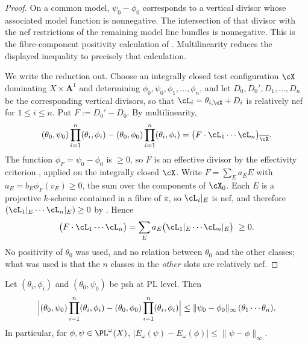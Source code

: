 \begin{proof}
On a common model, $\psi_0-\phi_0$ corresponds to a vertical divisor
whose associated model function is nonnegative.  The intersection of that
divisor with the nef restrictions of the remaining model line bundles is
nonnegative.  This is the fibre-component positivity calculation of
\cite[Lemma~3.15]{BJ22}.  Multilinearity reduces the displayed inequality
to precisely that calculation.

We write the reduction out.  Choose an integrally closed test
configuration $\cX$ dominating $X\times\mathbf A^1$ and determining
$\phi_0,\psi_0,\phi_1,\dots,\phi_n$, and let $D_0,D_0',D_1,\dots,D_n$
be the corresponding vertical divisors, so that $\cL_i=\theta_{i,\cX}+D_i$
is relatively nef for $1\le i\le n$.  Put $F:=D_0'-D_0$.  By
multilinearity,
\[
 (\theta_0,\psi_0)\prod_{i=1}^n(\theta_i,\phi_i)
 -(\theta_0,\phi_0)\prod_{i=1}^n(\theta_i,\phi_i)
 =\bigl(F\cdot\cL_1\cdots\cL_n\bigr)_{\overline\cX}.
\]
The function $\phi_F=\psi_0-\phi_0$ is $\ge0$, so $F$ is an effective
divisor by the effectivity criterion , applied
on the integrally closed $\cX$.  Write $F=\sum_Ea_EE$ with
$a_E=b_E\phi_F(v_E)\ge0$, the sum over the components of $\cX_0$.  Each
$E$ is a projective $k$-scheme contained in a fibre of
$\overline\pi$, so $\cL_i|_E$ is nef, and therefore
$(\cL_1|_E\cdots\cL_n|_E)\ge0$ by .  Hence
\[
 \bigl(F\cdot\cL_1\cdots\cL_n\bigr)
 =\sum_Ea_E\bigl(\cL_1|_E\cdots\cL_n|_E\bigr)\ \ge0 .
\]
No positivity of $\theta_0$ was used, and no relation between
$\theta_0$ and the other classes; what was used is that the $n$
classes in the \emph{other} slots are relatively nef.
\end{proof}

\begin{corollary}
\label{cor:ch46-pl-lipschitz}
Let $(\theta_i,\phi_i)$ and $(\theta_0,\psi_0)$ be psh at PL level.
Then
\[
 \Bigl|(\theta_0,\psi_0)\prod_{i=1}^n(\theta_i,\phi_i)
      -(\theta_0,\phi_0)\prod_{i=1}^n(\theta_i,\phi_i)\Bigr|
 \le\lVert\psi_0-\phi_0\rVert_\infty\,(\theta_1\cdots\theta_n).
\]
In particular, for $\phi,\psi\in\PL^{\omega}(X)$,
$|E_\omega(\psi)-E_\omega(\phi)|\le\lVert\psi-\phi\rVert_\infty$.
\end{corollary}

